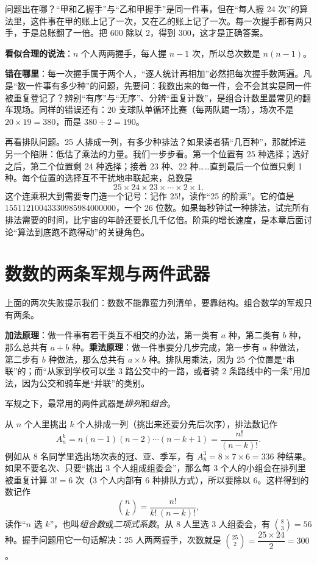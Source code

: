 问题出在哪？“甲和乙握手”与“乙和甲握手”是同一件事，但在“每人握 24 次”的算法里，这件事在甲的账上记了一次，又在乙的账上记了一次。每一次握手都有两只手，于是总账翻了一倍。把 600 除以 2，得到 300，这才是正确答案。

\begin{fanli}
\textbf{看似合理的说法}：$n$ 个人两两握手，每人握 $n-1$ 次，所以总次数是 $n(n-1)$。

\textbf{错在哪里}：每一次握手属于两个人，“逐人统计再相加”必然把每次握手数两遍。凡是“数一件事有多少种”的问题，先要问：我数出来的每一件，会不会其实是同一件被重复登记了？辨别“有序”与“无序”、分辨“重复计数”，是组合计数里最常见的翻车现场。同样的错误还有：20 支球队单循环比赛（每两队踢一场），场次不是 $20\times 19=380$，而是 $380\div 2=190$。
\end{fanli}

再看排队问题。25 人排成一列，有多少种排法？如果读者猜“几百种”，那就掉进另一个陷阱：低估了乘法的力量。我们一步步看。第一个位置有 25 种选择；选好之后，第二个位置剩 24 种选择；接着 23 种、22 种……直到最后一个位置只剩 1 种。每个位置的选择互不干扰地串联起来，总数是
\[
25\times 24\times 23\times\cdots\times 2\times 1.
\]
这个连乘积大到需要专门造一个记号：记作 $25!$，读作“25 的阶乘”。它的值是 $15511210043330985984000000$，一个 26 位数。如果每秒钟试一种排法，试完所有排法需要的时间，比宇宙的年龄还要长几千亿倍。阶乘的增长速度，是本章后面讨论“算法到底跑不跑得动”的关键角色。

\section{数数的两条军规与两件武器}

上面的两次失败提示我们：数数不能靠蛮力列清单，要靠结构。组合数学的军规只有两条。

\textbf{加法原理}：做一件事有若干类互不相交的办法，第一类有 $a$ 种，第二类有 $b$ 种，那么总共有 $a+b$ 种。\textbf{乘法原理}：做一件事要分几步完成，第一步有 $a$ 种做法，第二步有 $b$ 种做法，那么总共有 $a\times b$ 种。排队用乘法，因为 25 个位置是“串联”的；而“从家到学校可以坐 3 路公交中的一路，或者骑 2 条路线中的一条”用加法，因为公交和骑车是“并联”的类别。

军规之下，最常用的两件武器是\emph{排列}和\emph{组合}。

从 $n$ 个人里挑出 $k$ 个人排成一列（挑出来还要分先后次序），排法数记作
\[
A_n^k=n(n-1)(n-2)\cdots(n-k+1)=\frac{n!}{(n-k)!}.
\]
例如从 8 名同学里选出场次表的冠、亚、季军，有 $A_8^3=8\times 7\times 6=336$ 种结果。如果不要名次、只要“挑出 3 个人组成组委会”，那么每 3 个人的小组会在排列里被重复计算 $3!=6$ 次（3 个人内部有 6 种排队方式），所以要除以 6。这样得到的数记作
\[
\binom{n}{k}=\frac{n!}{k!\,(n-k)!},
\]
读作“$n$ 选 $k$”，也叫\emph{组合数}或\emph{二项式系数}。从 8 人里选 3 人组委会，有 $\binom{8}{3}=56$ 种。握手问题用它一句话解决：25 人两两握手，次数就是 $\binom{25}{2}=\dfrac{25\times 24}{2}=300$。

